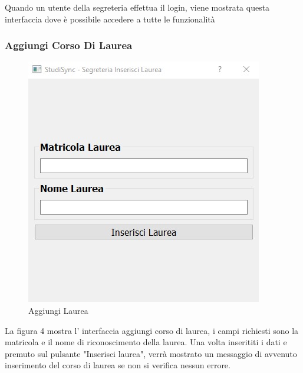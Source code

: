 \documentclass{article}
\begin{document}
Quando un utente della segreteria effettua il login, viene mostrata questa interfaccia dove è possibile accedere a tutte le funzionalità

\newpage

\subsubsection{Aggiungi Corso Di Laurea}
\newpage
\begin{figure}
    \centering
    \includegraphics[width=\linewidth]{IMG/inserisciLurea.jpg}
    \caption{Aggiungi Laurea}
    \label{fig:enter-label}
\end{figure}
La figura 4 mostra l' interfaccia aggiungi corso di laurea, i campi richiesti sono la matricola e il nome di riconoscimento della laurea. Una volta inserititi  i dati e premuto sul pulsante "Inserisci laurea", verrà mostrato un messaggio di avvenuto inserimento del corso di laurea se non si verifica nessun errore.
\end{document}
